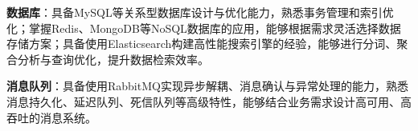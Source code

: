 \item \textbf{数据库}：具备MySQL等关系型数据库设计与优化能力，熟悉事务管理和索引优化；掌握Redis、MongoDB等NoSQL数据库的应用，能够根据需求灵活选择数据存储方案；具备使用Elasticsearch构建高性能搜索引擎的经验，能够进行分词、聚合分析与查询优化，提升数据检索效率。
\item \textbf{消息队列}：具备使用RabbitMQ实现异步解耦、消息确认与异常处理的能力，熟悉消息持久化、延迟队列、死信队列等高级特性，能够结合业务需求设计高可用、高吞吐的消息系统。